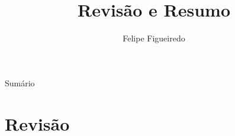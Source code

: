 \documentclass{beamer}
\title%
{Revisão e Resumo}
\subtitle
{} %
\author%
{Felipe Figueiredo}%
\institute[INTO] %
{Instituto Nacional de Traumatologia e Ortopedia
}
\date%
{}
\begin{document}
\begin{frame}
  \titlepage
\end{frame}

\begin{frame}{Sumário}
  \tableofcontents
\end{frame}








\section{Revisão}
\end{document}
